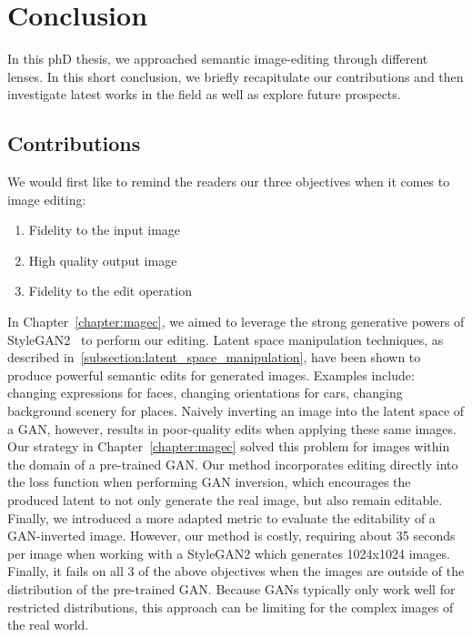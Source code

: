 \chapter{Conclusion}
\label{chapter:conclusion}

{}



In this phD thesis, we approached semantic image-editing through different lenses. 
In this short conclusion, we briefly recapitulate our contributions and then 
investigate latest works in the field as well as explore future prospects. 


\section{Contributions}

We would first like to remind the readers our three objectives when it comes to image editing:

\begin{enumerate}
    \item Fidelity to the input image
    \item High quality output image 
    \item Fidelity to the edit operation 
\end{enumerate} 

In Chapter~\ref{chapter:magec}, we aimed to leverage the strong generative powers of StyleGAN2~\citep{karra2020stylegan2}
to perform our editing. Latent space manipulation techniques, as described in~\ref{subsection:latent_space_manipulation}, have 
been shown to produce powerful semantic edits for generated images. Examples include: changing expressions for faces, changing 
orientations for cars, changing background scenery for places. Naively inverting an image into the latent space of a \ac{GAN},
however, results in poor-quality edits when applying these same images. Our \magec strategy in Chapter~\ref{chapter:magec} solved this problem 
for images within the domain of a pre-trained \ac{GAN}. Our method incorporates editing directly into the loss function when performing 
\ac{GAN} inversion, which encourages the produced latent to not only generate the real image, but also remain editable. Finally, we introduced 
a more adapted metric to evaluate the editability of a \ac{GAN}-inverted image. 
However, our method is costly, requiring about 35 seconds per image when working with a StyleGAN2 
which generates 1024x1024 images. Finally, it fails on all 3 of the above objectives when the images are outside of the 
distribution of the pre-trained \ac{GAN}. 
Because \ac{GAN}s typically only work well for restricted distributions, this approach can be limiting for the complex images of the real world.

